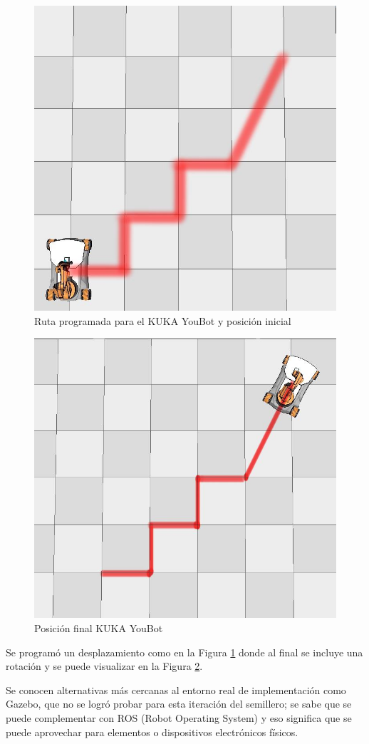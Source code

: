 \documentclass[conference]{IEEEtran}
\begin{document}
\begin{figure}
  \centering
  \includegraphics[width=0.6\linewidth]{figures/kuka_init_pos.jpg}
  \caption{Ruta programada para el KUKA YouBot y posición inicial}
  \label{fig:kukaroute}
\end{figure}

\begin{figure}
  \centering
  \includegraphics[width=0.6\linewidth]{figures/kuka_final_pos.jpg}
  \caption{Posición final KUKA YouBot}
  \label{fig:kukafinal}
\end{figure}

Se programó un desplazamiento como en la Figura \ref{fig:kukaroute} donde al final
se incluye una rotación y se puede visualizar en la Figura \ref{fig:kukafinal}.


Se conocen alternativas más cercanas al entorno real de implementación como
Gazebo\cite{noauthor_gazebo_nodate}, que no se logró probar para esta iteración del semillero; se sabe que se puede
complementar con ROS (Robot Operating System) y eso significa que se puede aprovechar
para elementos o dispositivos electrónicos físicos.
\end{document}
